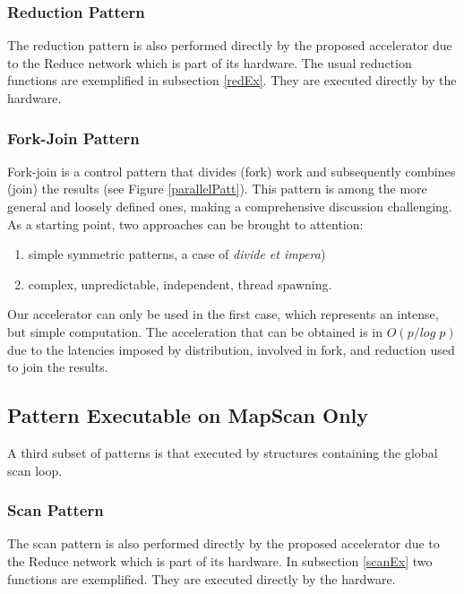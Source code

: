 \subsubsection{Reduction Pattern}

The reduction pattern is also performed directly by the proposed accelerator due to the Reduce network which is part of its hardware. The usual reduction functions are exemplified in subsection \ref{redEx}. They are executed directly by the hardware.

\subsubsection{Fork-Join  Pattern}

Fork-join is a control pattern that divides (fork)  work and subsequently combines (join) the results (see Figure \ref{parallelPatt}). This pattern is among the more general and loosely defined ones, making a comprehensive discussion challenging. As a starting point, two approaches can be brought to attention:
\begin{enumerate}
    \item simple symmetric patterns, a case of {\em divide et impera})
    \item complex, unpredictable, independent, thread spawning.
\end{enumerate}
Our accelerator can only be used  in the first case, which represents an intense, but simple computation.
The acceleration that can be obtained is in $O(p/log \; p)$ due to the latencies imposed by distribution, involved in fork, and reduction used to join the results.

\subsection{Pattern Executable on MapScan Only}

A third subset of patterns is that executed by structures containing the global scan loop.

\subsubsection{Scan Pattern}

 The scan pattern is also performed directly by the proposed accelerator due to the Reduce network which is part of its hardware. In subsection \ref{scanEx} two functions are exemplified. They are executed directly by the hardware.
 
